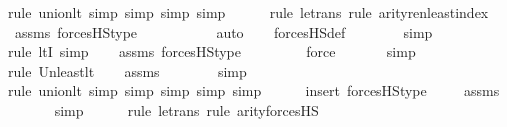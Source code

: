\begin{isabellebody}
{\isacharparenleft}{\kern0pt}rule\ union{\isacharunderscore}{\kern0pt}lt{}{\isacharcomma}{\kern0pt}\ simp{\isacharcomma}{\kern0pt}\ simp{\isacharcomma}{\kern0pt}\ simp{\isacharcomma}{\kern0pt}\ simp{\isacharparenright}{\kern0pt}\isanewline
\ \ \ \ \ \isamarkupfalse%
{\isacharparenleft}{\kern0pt}rule\ le{\isacharunderscore}{\kern0pt}trans{\isacharcomma}{\kern0pt}\ rule\ arity{\isacharunderscore}{\kern0pt}ren{\isacharunderscore}{\kern0pt}least{\isacharunderscore}{\kern0pt}index{\isacharparenright}{\kern0pt}\isanewline
\ \ \isamarkupfalse%
\ assms\ forcesHS{\isacharunderscore}{\kern0pt}type\ \ \isanewline
\ \ \ \ \ \ \ \isamarkupfalse%
\ auto{\isacharbrackleft}{\kern0pt}{}{\isacharbrackright}{\kern0pt}\isanewline
\ \ \isamarkupfalse%
\ forcesHS{\isacharunderscore}{\kern0pt}def\isanewline
\ \ \ \ \ \ \isamarkupfalse%
\ simp\isanewline
\ \ \ \ \ \ \isamarkupfalse%
{\isacharparenleft}{\kern0pt}rule\ ltI{\isacharcomma}{\kern0pt}\ simp{\isacharparenright}{\kern0pt}\isanewline
\ \ \isamarkupfalse%
\ assms\ forcesHS{\isacharprime}{\kern0pt}{\isacharunderscore}{\kern0pt}type\ \isanewline
\ \ \ \ \ \ \isamarkupfalse%
\ force\isanewline
\ \ \ \ \ \isamarkupfalse%
\ simp\isanewline
\ \ \ \ \ \isamarkupfalse%
{\isacharparenleft}{\kern0pt}rule\ Un{\isacharunderscore}{\kern0pt}least{\isacharunderscore}{\kern0pt}lt{\isacharparenright}{\kern0pt}\isanewline
\ \ \isamarkupfalse%
\ assms\isanewline
\ \ \ \ \ \ \isamarkupfalse%
\ simp\isanewline
\ \ \ \ \ \ \isamarkupfalse%
{\isacharparenleft}{\kern0pt}rule\ union{\isacharunderscore}{\kern0pt}lt{}{\isacharcomma}{\kern0pt}\ simp{\isacharcomma}{\kern0pt}\ simp{\isacharcomma}{\kern0pt}\ simp{\isacharcomma}{\kern0pt}\ simp{\isacharcomma}{\kern0pt}\ simp{\isacharparenright}{\kern0pt}\isanewline
\ \ \ \ \ \isamarkupfalse%
{\isacharparenleft}{\kern0pt}insert\ forcesHS{\isacharunderscore}{\kern0pt}type{\isacharbrackleft}{\kern0pt}\ {\isasymphi}{\isacharequal}{\kern0pt}{\isasymphi}{\isacharbrackright}{\kern0pt}{\isacharparenright}{\kern0pt}\isanewline
\ \ \isamarkupfalse%
\ assms\isanewline
\ \ \ \ \ \isamarkupfalse%
\ simp\isanewline
\ \ \ \ \ \isamarkupfalse%
{\isacharparenleft}{\kern0pt}rule\ le{\isacharunderscore}{\kern0pt}trans{\isacharcomma}{\kern0pt}\ rule\ arity{\isacharunderscore}{\kern0pt}forcesHS{\isacharparenright}{\kern0pt}\isanewline

\end{isabellebody}
